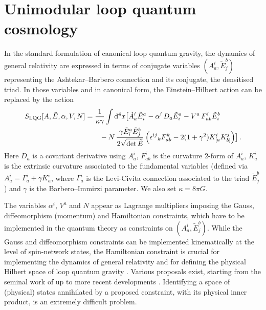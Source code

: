 \documentclass[aps,prd,11pt,showkeys,nofootinbib]{revtex4-2}
\begin{document}
\section{Unimodular loop quantum cosmology}
\label{LQCsec}

In the standard formulation of canonical loop quantum gravity, the dynamics of general relativity are expressed in terms of conjugate variables $(A_a^i, \tilde{E}_j^b)$ representing the Ashtekar--Barbero connection and its conjugate, the densitised triad. In those variables and in canonical form, the Einstein--Hilbert action can be replaced by the action \cite{Ashtekar:2004eh}
\begin{align}
  S_{{\rm LQG}}[A,\tilde{E},\alpha,V,N]&=\frac{1}{\kappa\gamma}\int {\rm d}^4 x\bigl[\dot{A}^i_a \tilde{E}_i^a - \alpha^i\,D_a\tilde{E}^a_i
 -V^a\,F^i_{ab}\tilde{E}^b_i
 \\& \qquad-N\,\frac{\gamma\tilde{E}^a_i\tilde{E}^b_j}{2\sqrt{\det \tilde{E}}}\left({\epsilon^{ij}}_k F^k_{ab}-2(1+\gamma^2)K^i_{[a}K^j_{b]}\right)\bigr]\,. \nonumber
\end{align}
Here $D_a$ is a covariant derivative using $A_a^i$, $F^i_{ab}$ is the curvature 2-form of $A_a^i$, $K^i_a$ is the extrinsic curvature associated to the fundamental variables (defined via $A^i_a = \Gamma^i_a + \gamma K^i_a$, where $\Gamma^i_a$ is the Levi-Civita connection associated to the triad $\tilde{E}_j^b$) and $\gamma$ is the Barbero--Immirzi parameter. We also set $\kappa=8\pi G$.

The variables $\alpha^i$, $V^a$ and $N$ appear as Lagrange multipliers imposing the Gauss, diffeomorphism (momentum) and Hamiltonian constraints, which have to be implemented in the quantum theory as constraints on $(A_a^i, \tilde{E}_j^b)$. While the Gauss and diffeomorphism constraints can be implemented kinematically at the level of spin-network states, the Hamiltonian constraint is crucial for implementing the dynamics of general relativity and for defining the physical Hilbert space of loop quantum gravity \cite{Ashtekar:2004eh}. Various proposals exist, starting from the seminal work of \cite{Thiemann_QSD} up to more recent developments \cite{Assanioussi:2015gka,Yang:2015zda,Varadarajan:2022dgg}. Identifying a space of (physical) states annihilated by a proposed constraint, with its physical inner product, is an extremely difficult problem.
\end{document}
